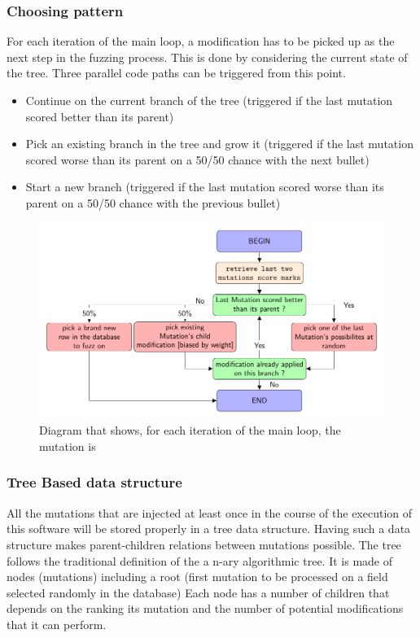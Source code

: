 \documentclass{article}
\begin{document}
\begin{empfile}
				\subsubsection{Choosing pattern}
For each iteration of the main loop, a modification has to be picked up as the next step in the fuzzing process. This is done by considering the current state of the tree.
Three parallel code paths can be triggered from this point.
				\begin{itemize}
				\item{Continue on the current branch of the tree (triggered if the last mutation scored better than its parent)}
				\item{Pick an existing branch in the tree and grow it (triggered if the last mutation scored worse than its parent on a 50/50 chance with the next bullet)}
				\item{Start a new branch (triggered if the last mutation scored worse than its parent on a 50/50 chance with the previous bullet)}
				\end{itemize}				
				
				\bigskip
			\begin{figure}[ht!]
			\includegraphics[width=\textwidth]{pickingPaternDiagram.pdf}
			\caption{Diagram that shows, for each iteration of the main loop, the mutation is }
			\end{figure}			
		
						\bigskip
			\subsubsection{Tree Based data structure}
All the mutations that are injected at least once in the course of the execution of this software will be stored properly in a tree data structure. Having such a data structure makes parent-children relations between mutations possible. The tree follows the traditional definition of the a n-ary algorithmic tree.
It is made of nodes (mutations) including a root (first mutation to be processed on a field selected randomly in the database)  
Each node has a number of children that depends on the ranking its mutation and the number of potential modifications that it can perform.

\end{empfile}
\end{document}
